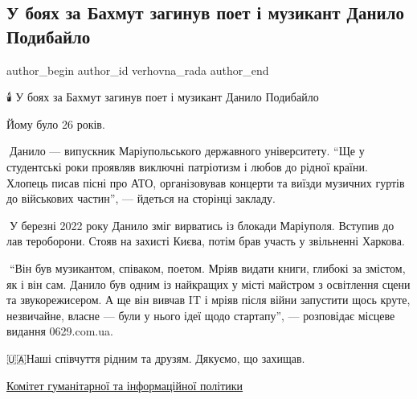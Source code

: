  
 
 
 
 

\subsection{У боях за Бахмут загинув поет і музикант Данило Подибайло}
\label{sec:02_06_2023.fb.verhovna_rada.1.u_bojah_za_bahmut_zagynuv_poet_i_muzykant_danylo_podybajlo}

\ifcmt
 author_begin
   author_id verhovna_rada
 author_end
\fi

🕯️ У боях за Бахмут загинув поет і музикант Данило Подибайло

Йому було 26 років.

🔹Данило — випускник Маріупольського державного університету. \enquote{Ще у студентські
роки проявляв виключні патріотизм і любов до рідної країни. Хлопець писав пісні
про АТО, організовував концерти та виїзди музичних гуртів до військових
частин}, — йдеться на сторінці закладу.

🔹У березні 2022 року Данило зміг вирватись із блокади Маріуполя. Вступив до
лав тероборони. Стояв на захисті Києва, потім брав участь у звільненні Харкова.

🔹\enquote{Він був музикантом, співаком, поетом. Мріяв видати книги, глибокі за
змістом, як і він сам. Данило був одним із найкращих у місті майстром з
освітлення сцени та звукорежисером. А ще він вивчав IT і мріяв після війни
запустити щось круте, незвичайне, власне — були у нього ідеї щодо стартапу}, —
розповідає місцеве видання 0629.com.ua. 

🇺🇦Наші співчуття рідним та друзям. Дякуємо, що захищав.

\href{https://www.facebook.com/komitetG}{Комітет гуманітарної та інформаційної політики}
